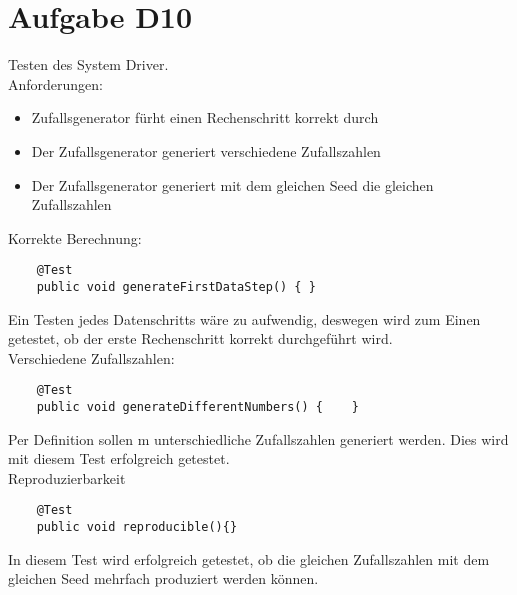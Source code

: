 
\chapter{Aufgabe D10}
Testen des System Driver.\\
Anforderungen:
\begin{itemize}
	\item Zufallsgenerator fürht einen Rechenschritt korrekt durch
	\item Der Zufallsgenerator generiert verschiedene Zufallszahlen
	\item Der Zufallsgenerator generiert mit dem gleichen Seed die gleichen Zufallszahlen
\end{itemize}

Korrekte Berechnung:
\begin{lstlisting}
    @Test
    public void generateFirstDataStep() { }
 \end{lstlisting}
 Ein Testen jedes Datenschritts wäre zu aufwendig, deswegen wird zum Einen getestet, ob der erste Rechenschritt korrekt durchgeführt wird.\\
 
 Verschiedene Zufallszahlen:
\begin{lstlisting}
    @Test
    public void generateDifferentNumbers() {    }
\end{lstlisting}
Per Definition sollen m unterschiedliche Zufallszahlen generiert werden. Dies wird mit diesem Test erfolgreich getestet.\\
    
Reproduzierbarkeit
\begin{lstlisting}
    @Test
    public void reproducible(){}
\end{lstlisting}
In diesem Test wird erfolgreich getestet, ob die gleichen Zufallszahlen mit dem gleichen Seed mehrfach produziert werden können.